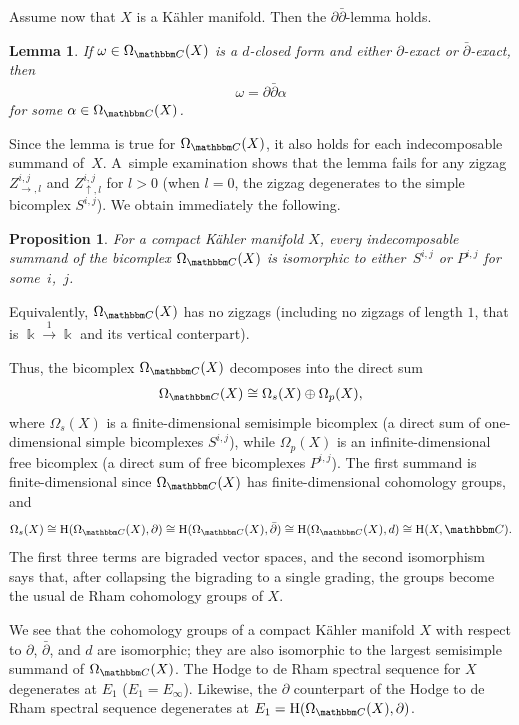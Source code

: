 \documentclass[10pt,a4paper]{amsart}
\newtheorem{lem}[thm]{Lemma}
\newtheorem{prop}[thm]{Proposition}
\theoremstyle{definition}
\numberwithin{equation}{section}
\def\C{{\mathbbm C}}
\def\lra{{\longrightarrow}}
\newcommand{\mH}{\mathrm{H}} %
\begin{document}
Assume now that $X$ is a K\"ahler manifold. Then the $\partial\bar{\partial}$-lemma
holds.

\begin{lem}
If $\omega\in \Omega_{\C}(X)$ is a $d$-closed form and
either $\partial$-exact or $\bar{\partial}$-exact, then
\begin{gather*}\omega= \partial\bar{\partial} \alpha\end{gather*}
for some $\alpha\in \Omega_{\C}(X)$.
\end{lem}

Since the lemma is true for $\Omega_{\C}(X)$, it also holds for each
indecomposable summand of~$X$. A~simple examination shows that
the lemma fails for any zigzag $Z^{i,j}_{\rightarrow,l}$ and
$Z^{i,j}_{\uparrow,l}$ for $l>0$ (when $l=0$, the zigzag degenerates
to the simple bicomplex $S^{i,j}$). We obtain immediately the following.

\begin{prop} For a compact K\"ahler manifold $X$, every indecomposable summand of the bicomplex $\Omega_{\C}(X)$ is isomorphic to either~$S^{i,j}$ or $P^{i,j}$ for some~$i$,~$j$.
\end{prop}

Equivalently, $\Omega_{\C}(X)$ has no zigzags (including no zigzags of length $1$, that is $\Bbbk \stackrel{1}{\lra} \Bbbk$ and its vertical conterpart).

Thus, the bicomplex $\Omega_{\C}(X)$ decomposes into the direct sum
\begin{gather*}\Omega_{\C}(X)\cong \Omega_s(X) \oplus \Omega_p(X),\end{gather*}
where $\Omega_s(X)$ is a finite-dimensional semisimple bicomplex (a
direct sum of one-dimensional simple bicomplexes $S^{i,j}$), while
$\Omega_p(X)$ is an infinite-dimensional free bicomplex (a direct
sum of free bicomplexes $P^{i,j}$). The first summand is finite-dimensional since $\Omega_{\C}(X)$ has finite-dimensional cohomology groups, and \begin{gather*}\Omega_s(X)\cong \mH(\Omega_{\C}(X), \partial) \cong
\mH(\Omega_{\C}(X),\bar{\partial}) \cong \mH(\Omega_{\C}(X), d) \cong \mH(X,\C).\end{gather*}
The first three terms are bigraded vector spaces, and the second isomorphism
says that, after collapsing the bigrading to a single grading, the groups become
the usual de Rham cohomology groups of $X$.

We see that the cohomology groups of a compact K\"ahler manifold $X$ with respect to $\partial$, $\bar{\partial}$,
and $d$ are isomorphic; they are also isomorphic to the largest semisimple summand
of $\Omega_{\C}(X)$. The Hodge to de Rham spectral sequence for $X$
degenerates at $E_1$ ($E_1=E_{\infty}$). Likewise, the $\partial$ counterpart of the Hodge to de Rham spectral sequence degenerates at
 $E_1=\mH(\Omega_{\C}(X), \partial)$.
\end{document}
